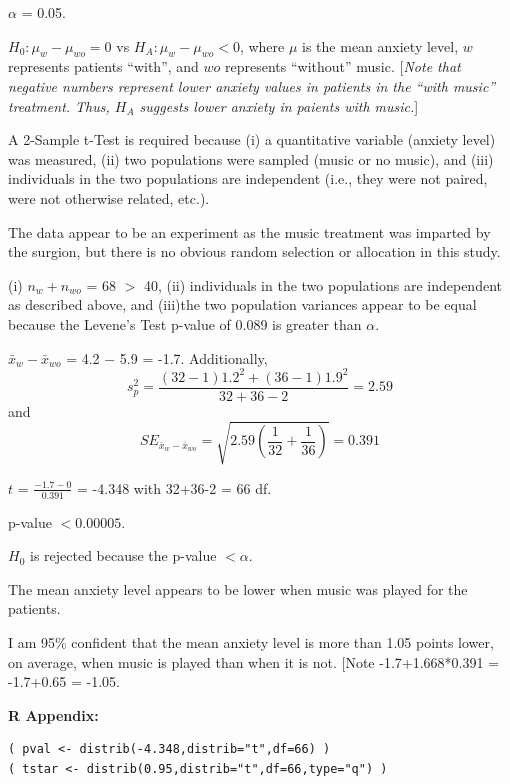 \documentclass[10pt,openany]{book}\usepackage[]{graphicx}\usepackage[]{color}
\makeatletter
\newenvironment{kframe}{%
 \def\at@end@of@kframe{}%
 \ifinner\ifhmode%
  \def\at@end@of@kframe{\end{minipage}}%
  \begin{minipage}{\columnwidth}%
 \fi\fi%
 \def\FrameCommand##1{\hskip\@totalleftmargin \hskip-\fboxsep
 \colorbox{shadecolor}{##1}\hskip-\fboxsep
     \hskip-\linewidth \hskip-\@totalleftmargin \hskip\columnwidth}%
 \MakeFramed {\advance\hsize-\width
   \@totalleftmargin\z@ \linewidth\hsize
   \@setminipage}}%
 {\par\unskip\endMakeFramed%
 \at@end@of@kframe}
\newenvironment{knitrout}{}{} %
\makeatother
\begin{document}
\begin{Enumerate}
  \item $\alpha$ = 0.05.
  \item $H_{0}:\mu_{w}-\mu_{wo} = 0$ vs $H_{A}:\mu_{w}-\mu_{wo}<0$, where $\mu$ is the mean anxiety level, $w$ represents patients ``with'', and $wo$ represents ``without'' music. [\textit{Note that negative numbers represent lower anxiety values in patients in the ``with music'' treatment. Thus, $H_{A}$ suggests lower anxiety in paients with music.}]
  \item A 2-Sample t-Test is required because (i) a quantitative variable (anxiety level) was measured, (ii) two populations were sampled (music or no music), and (iii) individuals in the two populations are independent (i.e., they were not paired, were not otherwise related, etc.).
  \item The data appear to be an experiment as the music treatment was imparted by the surgion, but there is no obvious random selection or allocation in this study.
  \item (i) $n_{w}+n_{wo}$ = 68 $>$ 40, (ii) individuals in the two populations are independent as described above, and (iii)the two population variances appear to be equal because the Levene's Test p-value of 0.089 is greater than $\alpha$.
  \item $\bar{x}_{w}-\bar{x}_{wo}$ = 4.2 $-$ 5.9 = -1.7. Additionally,
    \[s_{p}^{2}=\frac{(32-1)1.2^{2}+(36-1)1.9^{2}}{32+36-2} = 2.59 \]
and
    \[ SE_{\bar{x}_{w}-\bar{x}_{wo}}=\sqrt{2.59\left(\frac{1}{32}+\frac{1}{36} \right)} = 0.391  \]
  \item $t$ = $\frac{-1.7-0}{0.391}$ = -4.348 with 32+36-2 = 66 df.
  \item p-value $<0.00005$.
  \item $H_{0}$ is rejected because the p-value $< \alpha$.
  \item The mean anxiety level appears to be lower when music was played for the patients.
  \item I am 95\% confident that the mean anxiety level is more than 1.05 points lower, on average, when music is played than when it is not. [Note -1.7+1.668*0.391 = -1.7+0.65 = -1.05.
\end{Enumerate}

\vspace{-8pt}
\begin{minipage}{\textwidth}
\textbf{R Appendix:}
\vspace*{-6pt}
\begin{knitrout}
\color{fgcolor}\begin{kframe}
\begin{verbatim}
( pval <- distrib(-4.348,distrib="t",df=66) )
( tstar <- distrib(0.95,distrib="t",df=66,type="q") )
\end{verbatim}
\end{kframe}
\end{knitrout}
\end{minipage}
\end{document}
